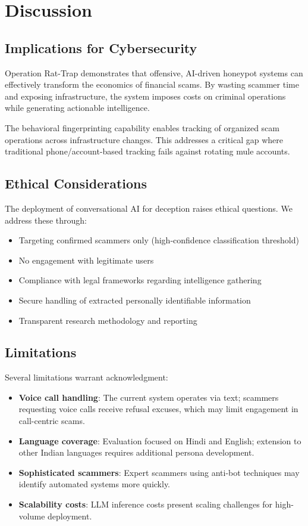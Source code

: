 \documentclass[conference]{IEEEtran}
\begin{document}
\section{Discussion}

\subsection{Implications for Cybersecurity}

Operation Rat-Trap demonstrates that offensive, AI-driven honeypot systems can effectively transform the economics of financial scams. By wasting scammer time and exposing infrastructure, the system imposes costs on criminal operations while generating actionable intelligence.

The behavioral fingerprinting capability enables tracking of organized scam operations across infrastructure changes. This addresses a critical gap where traditional phone/account-based tracking fails against rotating mule accounts.

\subsection{Ethical Considerations}

The deployment of conversational AI for deception raises ethical questions. We address these through:
\begin{itemize}
    \item Targeting confirmed scammers only (high-confidence classification threshold)
    \item No engagement with legitimate users
    \item Compliance with legal frameworks regarding intelligence gathering
    \item Secure handling of extracted personally identifiable information
    \item Transparent research methodology and reporting
\end{itemize}

\subsection{Limitations}

Several limitations warrant acknowledgment:
\begin{itemize}
    \item \textbf{Voice call handling}: The current system operates via text; scammers requesting voice calls receive refusal excuses, which may limit engagement in call-centric scams.
    \item \textbf{Language coverage}: Evaluation focused on Hindi and English; extension to other Indian languages requires additional persona development.
    \item \textbf{Sophisticated scammers}: Expert scammers using anti-bot techniques may identify automated systems more quickly.
    \item \textbf{Scalability costs}: LLM inference costs present scaling challenges for high-volume deployment.
\end{itemize}
\end{document}
